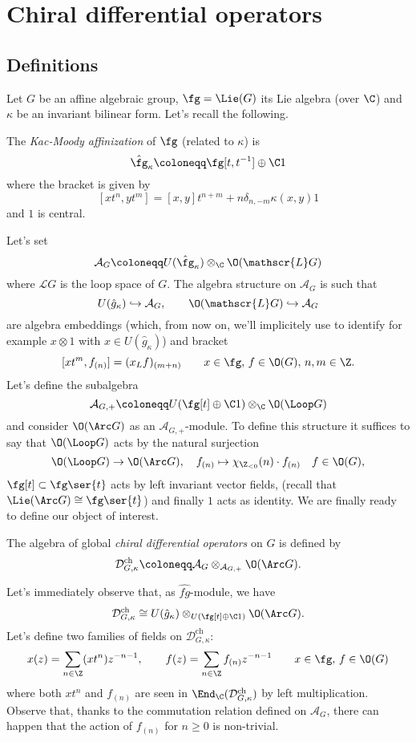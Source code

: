 \documentclass[a4paper, 10pt]{article}
\newcommand{\hg}{ \hat{g}_{\kappa} }                           %
\newcommand{\AG}{ \mathcal{A}_G }                          %
\newcommand{\Dc}{ \mathcal{D}^{\mathrm{ch}}_{G, \kappa} }         %
\begin{document}
    \section{Chiral differential operators}
        \subsection{Definitions}
            Let $G$ be an affine algebraic group, $\fg = \Lie(G)$ its Lie algebra (over $\C$) and $\kappa$ be an invariant bilinear form. Let's recall the following.
            \begin{defn}
                The \emph{Kac-Moody affinization} of $\fg$ (related to $\kappa$) is \[ \hat{\fg}_{\kappa} \coloneqq \fg[t, t^{-1}] \oplus \C 1\] where the bracket is given by \[[xt^n, yt^m] = [x, y]t^{n+m} + n\delta_{n, -m}\kappa(x, y)1 \] and $1$ is central.
            \end{defn}
            Let's set \[\mathcal{A}_G \coloneqq U(\hat{\fg}_{\kappa}) \otimes_{\C} \O(\mathscr{L}G) \] where $\mathscr{L}G$ is the loop space of $G$. The algebra structure on $\mathcal{A}_G$ is such that \[U(\hat{g}_{\kappa}) \hookrightarrow \mathcal{A}_G,\qquad \O(\mathscr{L}G) \hookrightarrow \mathcal{A}_G \] are algebra embeddings (which, from now on, we'll implicitely use to identify for example $x \otimes 1$ with $x \in U(\hat{g}_{\kappa})$) and bracket \[[xt^m, f_{(n)}] = (x_Lf)_{(m+n)} \qquad x \in \fg,\, f \in \O(G),\, n, m \in \Z. \] 
            Let's define the subalgebra \[\mathcal{A}_{G, +} \coloneqq U(\fg[t] \oplus \C 1) \otimes_{\C} \O(\Loop G) \] and consider $\O(\Arc G)$ as an $\mathscr{A}_{G, +}$-module. To define this structure it suffices to say that $\O(\Loop G)$ acts by the natural surjection \[\O(\Loop G) \to \O(\Arc G), \quad f_{(n)} \mapsto \chi_{\Z_{<0}}(n) \cdot f_{(n)} \quad f \in \O(G), \] $\fg[t] \subset \fg\ser{t}$ acts by left invariant vector fields, (recall that $\Lie(\Arc G) \cong \fg\ser{t}$) and finally $1$ acts as identity. 
            We are finally ready to define our object of interest.
            \begin{defn}
                The algebra of global \emph{chiral differential operators} on $G$ is defined by \[\Dc \coloneqq \AG \otimes_{\mathcal{A}_{G, +}} \O(\Arc G). \]
            \end{defn}
            Let's immediately observe that, as $\hat{fg}$-module, we have \[\Dc \cong U(\hg) \otimes_{U(\fg[t] \oplus \C 1) } \O(\Arc G). \] Let's define two families of fields on $\Dc$:
            \[x(z) = \sum_{n \in \Z} (xt^n)z^{-n-1}, \qquad f(z) = \sum_{n \in \Z} f_{(n)}z^{-n-1} \qquad x \in \fg,\, f \in \O(G)\] where both $xt^n$ and $f_{(n)}$ are seen in $\End_{\C}(\Dc)$ by left multiplication. Observe that, thanks to the commutation relation defined on $\AG$, there can happen that the action of $f_{(n)}$ for $n \geq 0$ is non-trivial.
\end{document}
